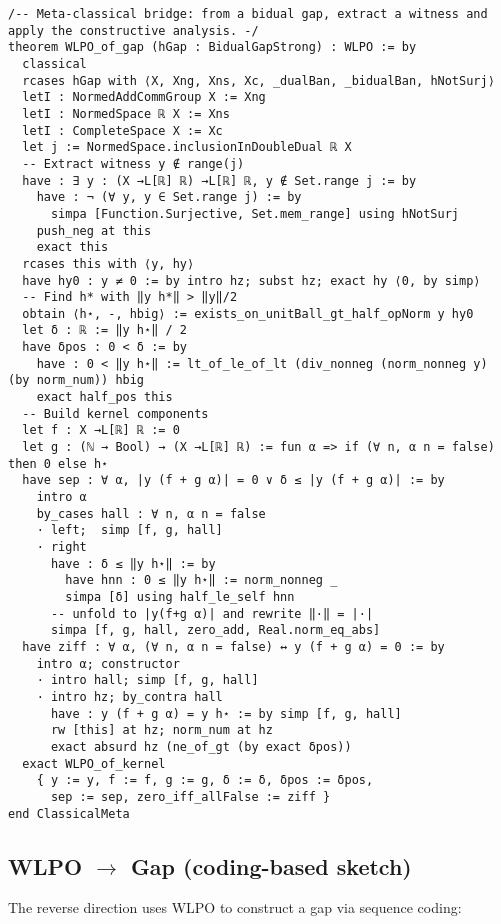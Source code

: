 \documentclass[11pt]{article}
\begin{document}
\begin{lstlisting}[caption={Meta-classical: from bidual gap to WLPO},label={lst:bridge}]
/-- Meta-classical bridge: from a bidual gap, extract a witness and apply the constructive analysis. -/
theorem WLPO_of_gap (hGap : BidualGapStrong) : WLPO := by
  classical
  rcases hGap with ⟨X, Xng, Xns, Xc, _dualBan, _bidualBan, hNotSurj⟩
  letI : NormedAddCommGroup X := Xng
  letI : NormedSpace ℝ X := Xns
  letI : CompleteSpace X := Xc
  let j := NormedSpace.inclusionInDoubleDual ℝ X
  -- Extract witness y ∉ range(j)
  have : ∃ y : (X →L[ℝ] ℝ) →L[ℝ] ℝ, y ∉ Set.range j := by
    have : ¬ (∀ y, y ∈ Set.range j) := by
      simpa [Function.Surjective, Set.mem_range] using hNotSurj
    push_neg at this
    exact this
  rcases this with ⟨y, hy⟩
  have hy0 : y ≠ 0 := by intro hz; subst hz; exact hy ⟨0, by simp⟩
  -- Find h* with ‖y h*‖ > ‖y‖/2
  obtain ⟨h⋆, -, hbig⟩ := exists_on_unitBall_gt_half_opNorm y hy0
  let δ : ℝ := ‖y h⋆‖ / 2
  have δpos : 0 < δ := by
    have : 0 < ‖y h⋆‖ := lt_of_le_of_lt (div_nonneg (norm_nonneg y) (by norm_num)) hbig
    exact half_pos this
  -- Build kernel components
  let f : X →L[ℝ] ℝ := 0
  let g : (ℕ → Bool) → (X →L[ℝ] ℝ) := fun α => if (∀ n, α n = false) then 0 else h⋆
  have sep : ∀ α, |y (f + g α)| = 0 ∨ δ ≤ |y (f + g α)| := by
    intro α
    by_cases hall : ∀ n, α n = false
    · left;  simp [f, g, hall]
    · right
      have : δ ≤ ‖y h⋆‖ := by
        have hnn : 0 ≤ ‖y h⋆‖ := norm_nonneg _
        simpa [δ] using half_le_self hnn
      -- unfold to |y(f+g α)| and rewrite ‖·‖ = |·|
      simpa [f, g, hall, zero_add, Real.norm_eq_abs]
  have ziff : ∀ α, (∀ n, α n = false) ↔ y (f + g α) = 0 := by
    intro α; constructor
    · intro hall; simp [f, g, hall]
    · intro hz; by_contra hall
      have : y (f + g α) = y h⋆ := by simp [f, g, hall]
      rw [this] at hz; norm_num at hz
      exact absurd hz (ne_of_gt (by exact δpos))
  exact WLPO_of_kernel
    { y := y, f := f, g := g, δ := δ, δpos := δpos, 
      sep := sep, zero_iff_allFalse := ziff }
end ClassicalMeta
\end{lstlisting}

\subsection{WLPO $\to$ Gap (coding-based sketch)}

The reverse direction uses WLPO to construct a gap via sequence coding:
\end{document}
